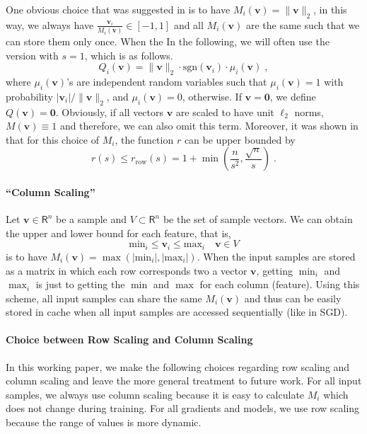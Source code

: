 \documentclass{article}
\newcommand{\R}{\mathsf{R}}
\newcommand{\sgn}[1]{\mbox{sgn}(#1)}
\renewcommand{\vec}[1]{\mathbf{#1}}
\def\rrow{r_\mathrm{row}}
\begin{document}
One obvious choice that was suggested in \cite{QSGD} is to have $M_i(\vec{v}) = \| \vec{v} \|_2$, in this way, we
always have $\frac{\vec{v}_i}{M_i(\vec{v})} \in [-1, 1]$ and all $M_i(\vec{v})$ are the same
such that we can store them only once.
When the 
In the following, we will often use the version with $s = 1$, which is as follows. 
\begin{equation}
\label{equ:quant1}
Q_i(\vec{v}) = \| \vec{v} \|_2 \cdot \sgn{\vec{v}_i} \cdot \mu_i (\vec{v}) \; ,
\end{equation}
where $\mu_i(\vec{v})$'s are independent random variables such that $\mu_i(\vec{v}) = 1$ with probability $|\vec{v}_i| / \| \vec{v} \|_2$, and $\mu_i(\vec{v}) = 0$, otherwise. If $\vec{v} = \vec{0}$, we define $Q(\vec{v}) = \vec{0}$. 
%
Obviously, if
all vectors $\vec{v}$ are scaled to have unit $\ell_2$ norms, $M(\vec{v}) \equiv 1$
and therefore, we can also omit this term.
Moreover, it was shown in \cite{QSGD} that for this choice of $M_i$, the function $r$ can be upper bounded by
\[
r(s) \leq \rrow (s) = 1 + \min\left( \frac{n}{s^2}, \frac{\sqrt{n}}{s} \right) \; .
\]

\paragraph*{``Column Scaling''}
Let $\vec{v} \in \R^n$ be a sample and $V \subset \R^n$ be the set of sample vectors. 
We can obtain the upper and lower bound for each feature, that is,
\[
\text{min}_i \le \vec{v}_i \le  \text{max}_i\quad \vec{v} \in V
\]
is to have $M_i(\vec{v}) = \max(|\text{min}_i|, |\text{max}_i|)$.
When the input samples are stored as a matrix in which each row corresponds
two a vector $\vec{v}$, getting $\min_i$ and $\max_i$
is just to getting
the $\min$ and $\max$ for each column (feature).
Using this scheme, all input samples can share the same
$M_i(\vec{v})$ and thus can be easily stored in cache when all
input samples are accessed sequentially (like in SGD).


\paragraph*{Choice between Row Scaling and Column Scaling}

In this working paper, we make the following choices regarding row scaling
and column scaling and leave the more general treatment to future work.
For all input samples, we always use column scaling because it is easy
to calculate $M_i$ which does not change during training. For all gradients
and models, we use row scaling because the range of values is more dynamic.
\end{document}
